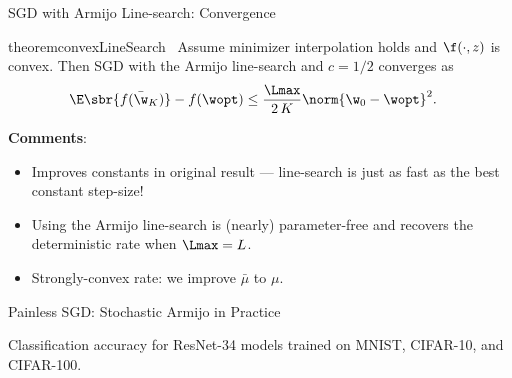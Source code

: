 \documentclass[mathserif,notheorems, hyperref={colorlinks, citecolor=blue, urlcolor=blue, linkcolor=blue}]{beamer}
\begin{document}
\begin{frame}{SGD with Armijo Line-search: Convergence}
	\begin{restatable}{theorem}{convexLineSearch}~\label{thm:convex-line-search}
		Assume minimizer interpolation holds and \( \f(\cdot, z) \) is convex.
		Then SGD with the Armijo line-search and \( c = 1/2 \) converges as
		\begin{align*}
			\E\sbr{f(\bar \w_K)} - f(\wopt) & \leq \frac{\Lmax}{2 \, K} \norm{\w_0 - \wopt}^2.
		\end{align*}
	\end{restatable}
	\pause

	\textbf{Comments}:
	\begin{itemize}
		\item Improves constants in original result \citep{vaswani2019painless} ---
		      line-search is just as fast as the best constant step-size!
		      \pause
		\item Using the Armijo line-search is (nearly) parameter-free and recovers the deterministic rate when \( \Lmax = L \).
		      \pause
		\item Strongly-convex rate: we improve \( \bar \mu \) to \( \mu \).
	\end{itemize}

\end{frame}


\begin{frame}{Painless SGD: Stochastic Armijo in Practice}

	{\large Classification accuracy for ResNet-34 models trained on MNIST, CIFAR-10, and CIFAR-100. }\vspace{0.5em}

	\begin{figure}
		\centering
		\vspace{0.5em}
	\end{figure}

\end{frame}
\end{document}
